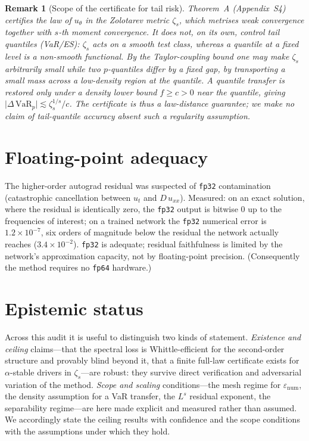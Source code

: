 \documentclass[11pt]{article}
\newtheorem{remark}{Remark}
\begin{document}
\begin{remark}[Scope of the certificate for tail risk]
Theorem~A (Appendix~S4) certifies the law of $u_\theta$ in the Zolotarev metric $\zeta_s$,
which metrises weak convergence together with $s$-th moment convergence. It does
\emph{not}, on its own, control tail quantiles (VaR/ES): $\zeta_s$ acts on a smooth test
class, whereas a quantile at a fixed level is a non-smooth functional. By the
Taylor-coupling bound one may make $\zeta_s$ arbitrarily small while two $p$-quantiles
differ by a fixed gap, by transporting a small mass across a low-density region at the
quantile. A quantile transfer is restored only under a density lower bound $f\ge c>0$ near
the quantile, giving $\lvert\Delta\,\mathrm{VaR}_p\rvert\lesssim\zeta_s^{1/s}/c$. The
certificate is thus a law-distance guarantee; we make no claim of tail-quantile accuracy
absent such a regularity assumption.
\end{remark}

\section{Floating-point adequacy}
The higher-order autograd residual was suspected of \texttt{fp32} contamination
(catastrophic cancellation between $u_t$ and $D\,u_{xx}$). Measured: on an exact solution,
where the residual is identically zero, the \texttt{fp32} output is bitwise $0$ up to the
frequencies of interest; on a trained network the \texttt{fp32} numerical error is
$1.2\times10^{-7}$, six orders of magnitude below the residual the network actually reaches
($3.4\times10^{-2}$). \texttt{fp32} is adequate; residual faithfulness is limited by the
network's approximation capacity, not by floating-point precision. (Consequently the method
requires no \texttt{fp64} hardware.)

\section{Epistemic status}
Across this audit it is useful to distinguish two kinds of statement. \emph{Existence and
ceiling} claims---that the spectral loss is Whittle-efficient for the second-order
structure and provably blind beyond it, that a finite full-law certificate exists for
$\alpha$-stable drivers in $\zeta_s$---are robust: they survive direct verification and
adversarial variation of the method. \emph{Scope and scaling} conditions---the mesh regime
for $\varepsilon_{\mathrm{num}}$, the density assumption for a VaR transfer, the $L^s$
residual exponent, the separability regime---are here made explicit and measured rather than
assumed. We accordingly state the ceiling results with confidence and the scope conditions
with the assumptions under which they hold.
\end{document}

